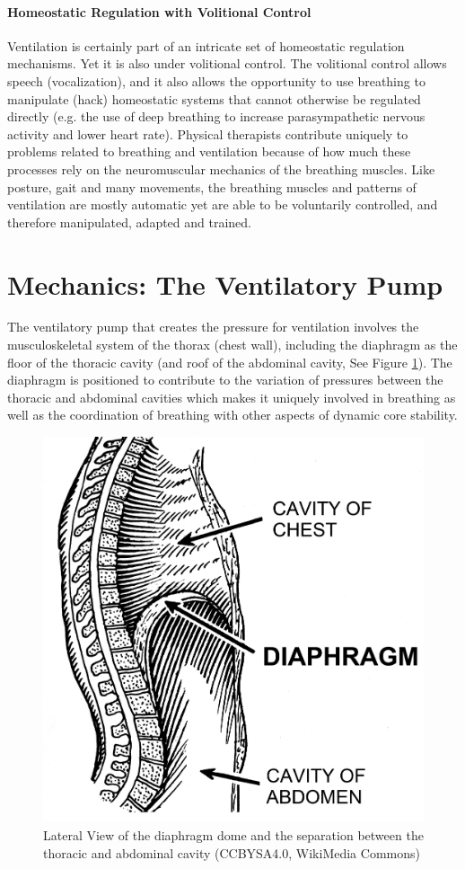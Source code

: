 \paragraph{Homeostatic Regulation with Volitional Control} Ventilation is certainly part of an intricate set of homeostatic regulation mechanisms. Yet it is also under volitional control. The volitional control allows speech (vocalization), and it also allows the opportunity to use breathing to manipulate (hack) homeostatic systems that cannot otherwise be regulated directly (e.g. the use of deep breathing to increase parasympathetic nervous activity and lower heart rate). Physical therapists contribute uniquely to problems related to breathing and ventilation because of how much these processes rely on the neuromuscular mechanics of the breathing muscles. Like posture, gait and many movements, the breathing muscles and patterns of ventilation are mostly automatic yet are able to be voluntarily controlled, and therefore manipulated, adapted and trained.


\section{Mechanics: The Ventilatory Pump}

The ventilatory pump that creates the pressure for ventilation involves the musculoskeletal system of the thorax (chest wall), including the diaphragm as the floor of the thoracic cavity (and roof of the abdominal cavity, See Figure \ref{fig:diaphragm_lateral}). The diaphragm is positioned to contribute to the variation of pressures between the thoracic and abdominal cavities which makes it uniquely involved in breathing as well as the coordination of breathing with other aspects of dynamic core stability. 

\begin{figure}[!h]
    \centering
    \includegraphics[width=0.5 \linewidth]{./figure/ventilation/diaphragm_lateral.png}
    \caption{Lateral View of the diaphragm dome and the separation between the thoracic and abdominal cavity \footnotesize{(CCBYSA4.0, WikiMedia Commons)}}
    \label{fig:diaphragm_lateral}
\end{figure}

